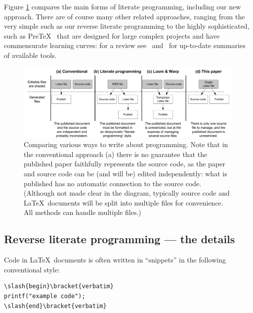 \documentclass[preprint,times]{elsarticle}
\def\slash{\tt \char'134}
\def\bracket#1{\tt \{#1\}}
\begin{document}

Figure \ref{fig:lp} compares the main forms of literate programming, including our new approach. There are of course many other related approaches, ranging from the very simple such as our reverse literate programming to the highly sophisticated, such as Pre\TeX\ \cite{pretex} that are designed for large complex projects and have commensurate learning curves: for a review see~\cite{warp} and~\cite{wiki} for up-to-date summaries of available tools.

\begin{figure}
\begin{center}
\noindent\includegraphics[width=4.9in]{figures/literateProgramming.pdf}
\end{center}
\caption{Comparing various ways to write about programming. Note that in the conventional approach (a) there is no guarantee that the published paper faithfully represents the source code, as the paper and source code can be (and will be) edited independently: what is published has no automatic connection to the source code. (Although not made clear in the diagram, typically source code and \LaTeX\ documents will be split into multiple files for convenience. All methods can handle multiple files.)}
\label{fig:lp}
\end{figure}

\subsection{Reverse literate programming --- the details}\label{relit-intro}

Code in \LaTeX\ documents is often written in ``snippets'' in the following conventional style:

\begin{Verbatim}[commandchars=\\\{\}]
\slash{begin}\bracket{verbatim}
printf("example code");
\slash{end}\bracket{verbatim}
\end{Verbatim}
\end{document}
